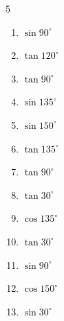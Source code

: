 \begin{multicols}{5}
\begin{enumerate}
  \item $\displaystyle \sin{90^\circ}$

        \phantom{$\displaystyle =1$}

  \item $\displaystyle \tan{120^\circ}$


  \item $\displaystyle \tan{90^\circ}$

        \phantom{$\displaystyle なし$}

  \item $\displaystyle \sin{135^\circ}$


  \item $\displaystyle \sin{150^\circ}$


\columnbreak %

  \item $\displaystyle \tan{135^\circ}$

        \phantom{$\displaystyle =-1$}

  \item $\displaystyle \tan{90^\circ}$

        \phantom{$\displaystyle なし$}

  \item $\displaystyle \tan{30^\circ}$


  \item $\displaystyle \cos{135^\circ}$


  \item $\displaystyle \tan{30^\circ}$


  \item $\displaystyle \sin{90^\circ}$

        \phantom{$\displaystyle =1$}

  \item $\displaystyle \cos{150^\circ}$


  \item $\displaystyle \sin{30^\circ}$


\end{enumerate}
\end{multicols}
